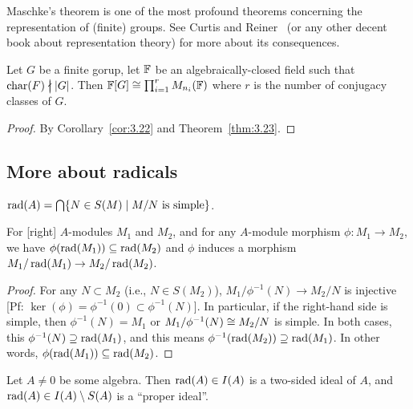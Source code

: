 \begin{remark}
Maschke's theorem is one of the most profound theorems concerning the
representation of (finite) groups. See Curtis and Reiner~\cite{curtis1962representation}
(or any other decent book about representation theory) for more about
its consequences.
\end{remark}

\begin{corollary}\label{cor:3.24}
Let $G$ be a finite gorup, let $\mathbb{F}$ be an algebraically-closed field
such that $\Char(F)\ndivides|G|$. Then $\mathbb{F}[G]\cong\prod^{r}_{i=1}M_{n_{i}}(\mathbb{F})$
where $r$ is the number of conjugacy classes of $G$.
\end{corollary}

\begin{proof}
By Corollary~\ref{cor:3.22} and Theorem~\ref{thm:3.23}.
\end{proof}

\subsection{More about radicals}

\begin{fact}
$\operatorname{rad}(A)=\bigcap\{N\in S(M)\mid M/N\mbox{ is simple}\}$.
\end{fact}

\begin{lemma}\label{lemma:4.1}
For [right] $A$-modules $M_{1}$ and $M_{2}$, and for any $A$-module
morphism $\phi\colon M_{1}\to M_{2}$, we have $\phi(\operatorname{rad}(M_{1}))\subseteq\operatorname{rad}(M_{2})$
and $\phi$ induces a morphism $M_{1}/\operatorname{rad}(M_{1})\to M_{2}/\operatorname{rad}(M_{2})$.
\end{lemma}

\begin{proof}
For any $N\subset M_{2}$ (i.e., $N\in S(M_{2})$),
$M_{1}/\phi^{-1}(N)\to M_{2}/N$ is injective [Pf: $\ker(\phi)=\phi^{-1}(0)\subset\phi^{-1}(N)$].
In particular, if the right-hand side is simple, then
$\phi^{-1}(N)=M_{1}$ or $M_{1}/\phi^{-1}(N)\cong M_{2}/N$ is simple. In
both cases, this $\phi^{-1}(N)\supseteq\operatorname{rad}(M_{1})$, and this means
$\phi^{-1}(\operatorname{rad}(M_{2}))\supseteq\operatorname{rad}(M_{1})$. In other words, $\phi(\operatorname{rad}(M_{1}))\subseteq\operatorname{rad}(M_{2})$.
\end{proof}

\begin{proposition}\label{prop:4.2}
Let $A\neq0$ be some algebra. Then $\operatorname{rad}(A)\in I(A)$ is a two-sided
ideal of $A$, and $\operatorname{rad}(A)\in I(A)\setminus S(A)$ is a ``proper ideal''.
\end{proposition}

